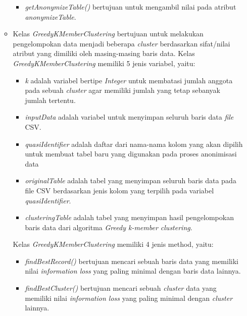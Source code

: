 \documentclass[a4paper,twoside]{article}
\begin{document}
\begin{enumerate}
\begin{itemize}
\begin{itemize}
\item \textit{getAnonymizeTable()} bertujuan untuk mengambil nilai pada atribut \textit{anonymizeTable}.

\end{itemize}

\item Kelas \textit{GreedyKMemberClustering} bertujuan untuk melakukan pengelompokan data menjadi beberapa \textit{cluster} berdasarkan sifat/nilai atribut yang dimiliki oleh masing-masing baris data. Kelas \textit{GreedyKMemberClustering} memiliki 5 jenis variabel, yaitu:

\begin{itemize}

\item \textit{k} adalah variabel bertipe \textit{Integer} untuk membatasi jumlah anggota pada sebuah \textit{cluster} agar memiliki jumlah yang tetap sebanyak jumlah tertentu.

\item \textit{inputData} adalah variabel untuk menyimpan seluruh baris data \textit{file} CSV.

\item \textit{quasiIdentifier} adalah daftar dari nama-nama kolom yang akan dipilih untuk membuat tabel baru yang digunakan pada proses anonimisasi data

\item \textit{originalTable} adalah tabel yang menyimpan seluruh baris data pada file CSV berdasarkan jenis kolom yang terpilih pada variabel \textit{quasiIdentifier}.

\item \textit{clusteringTable} adalah tabel yang menyimpan hasil pengelompokan baris data dari algoritma \textit{Greedy k-member clustering}.

\end{itemize}

\noindent Kelas \textit{GreedyKMemberClustering} memiliki 4 jenis method, yaitu:

\begin{itemize}
\item \textit{findBestRecord()} bertujuan mencari sebuah baris data yang memiliki nilai \textit{information loss} yang paling minimal dengan baris data lainnya. 

\item \textit{findBestCluster()} bertujuan mencari sebuah \textit{cluster} data yang memiliki nilai \textit{information loss} yang paling minimal dengan \textit{cluster} lainnya.


\end{itemize}
\end{itemize}
\end{enumerate}
\end{document}
